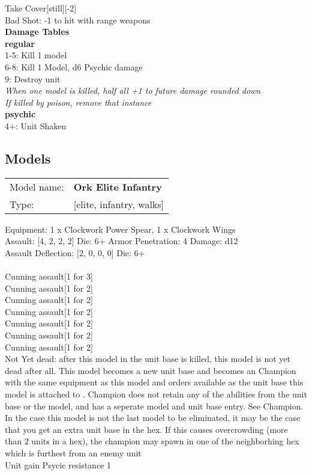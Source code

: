 Take Cover[still][-2]\\ 
Bad Shot: -1 to hit with range weapons\\ 



{\bf Damage Tables} \\
 {\bf regular } \\
1-5: Kill 1 model \\
6-8: Kill 1 Model, d6 Psychic damage \\
9: Destroy unit \\
{{\it When one model is killed, half all +1 to future damage rounded down}} \\
{{\it If killed by poison, remove that instance}} \\
 {\bf psychic } \\
4+: Unit Shaken \\


\clearpage

\subsection{ Models }

\begin{tabular}{ll}
Model name: & {\bf Ork Elite Infantry } \\
Type: & [elite, infantry, walks] \\
\end{tabular}

Equipment: 1 x Clockwork Power Spear, 1 x Clockwork Wings \\

Assault: [4, 2, 2, 2] Die: 6+ Armor Penetration: 4 Damage: d12 \\
Assault Deflection: [2, 0, 0, 0] Die: 6+\\
\\ 
Cunning assault[1 for 3]\\ 
Cunning assault[1 for 2]\\ 
Cunning assault[1 for 2]\\ 
Cunning assault[1 for 2]\\ 
Cunning assault[1 for 2]\\ 
Cunning assault[1 for 2]\\ 
Cunning assault[1 for 2]\\ 
 

Not Yet dead: after this model in the unit base is killed, this model is not yet dead after all. This model becomes a new unit base and becomes an Champion with the same equipment as this model and orders available as the unit base this model is attached to . Champion does not retain any of the abilities from the unit base or the model, and has a seperate model and unit base entry. See Champion. In the case this model is not the last model to be eliminated, it may be the case that you get an extra unit base in the hex. If this causes overcrowding (more than 2 units in a hex), the champion may spawn in one of the neighborhing hex which is furthest from an enemy unit\\ 
Unit gain Psycic resistance 1\\ 


